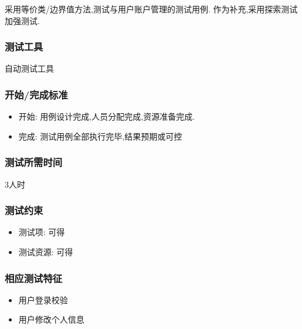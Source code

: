 \documentclass[hyperref, a4paper]{ctexart}
\providecommand{\tightlist}{%
  \setlength{\itemsep}{0pt}\setlength{\parskip}{0pt}}
\begin{document}
采用等价类/边界值方法,测试与用户账户管理的测试用例.
作为补充,采用探索测试加强测试.

\hypertarget{ux6d4bux8bd5ux5de5ux5177-2}{%
\subsubsection{测试工具}\label{ux6d4bux8bd5ux5de5ux5177-2}}

自动测试工具

\hypertarget{ux5f00ux59cbux5b8cux6210ux6807ux51c6-2}{%
\subsubsection{开始/完成标准}\label{ux5f00ux59cbux5b8cux6210ux6807ux51c6-2}}

\begin{itemize}
\tightlist
\item
  开始: 用例设计完成,人员分配完成,资源准备完成.
\item
  完成: 测试用例全部执行完毕,结果预期或可控
\end{itemize}

\hypertarget{ux6d4bux8bd5ux6240ux9700ux65f6ux95f4-2}{%
\subsubsection{测试所需时间}\label{ux6d4bux8bd5ux6240ux9700ux65f6ux95f4-2}}

3人时

\hypertarget{ux6d4bux8bd5ux7ea6ux675f-2}{%
\subsubsection{测试约束}\label{ux6d4bux8bd5ux7ea6ux675f-2}}

\begin{itemize}
\tightlist
\item
  测试项: 可得
\item
  测试资源: 可得
\end{itemize}

\hypertarget{ux76f8ux5e94ux6d4bux8bd5ux7279ux5f81-2}{%
\subsubsection{相应测试特征}\label{ux76f8ux5e94ux6d4bux8bd5ux7279ux5f81-2}}

\begin{itemize}
\tightlist
\item
  用户登录校验
\item
  用户修改个人信息
\end{itemize}
\end{document}
